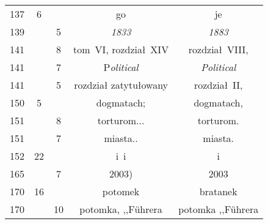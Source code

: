 \documentclass[a4paper,11pt]{article}  %
\begin{document}
\begin{center}
\begin{tabular}{|c|c|c|c|c|}
    137 &  6 & & go & je \\
    139 & &  5 & \emph{1833} & \emph{1883} \\
    141 & &  8 & tom~VI, rozdział~XIV & rozdział~VIII, \\
    141 & &  7 & P\emph{olitical} & \emph{Political} \\
    141 & &  5 & rozdział zatytułowany & rozdział~II, \\
    150 &  5 & & dogmatach; & dogmatach, \\
    151 & &  8 & torturom... & torturom. \\
    151 & &  7 & miasta.. & miasta. \\
    152 & 22 & & i~i & i \\
    165 & &  7 & 2003) & 2003 \\
    170 & 16 & & potomek & bratanek \\
    170 & & 10 & potomka, ,,F\"{u}hrera & potomka ,,F\"{u}hrera \\
    \hline
  \end{tabular}


\end{center}
\end{document}
